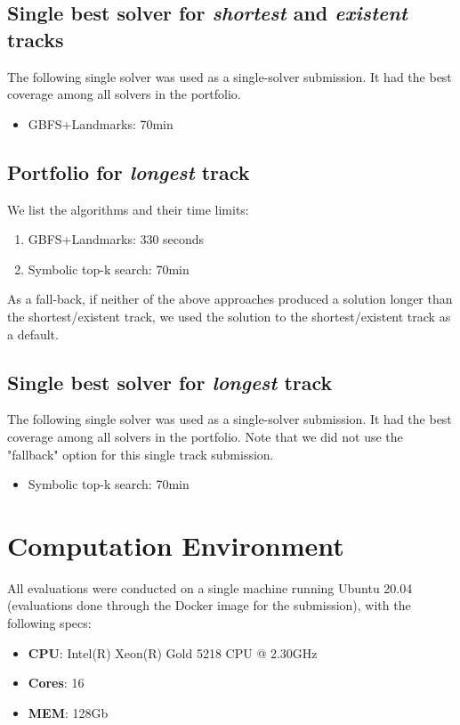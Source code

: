 \documentclass{article}
\begin{document}
\subsection{Single best solver for \emph{shortest} and \emph{existent} tracks}

The following single solver was used as a single-solver submission. It had the best coverage among all solvers in the portfolio.

\begin{itemize}
    \item GBFS+Landmarks: 70min
\end{itemize}

\subsection{Portfolio for \emph{longest} track}

We list the algorithms and their time limits:

\begin{enumerate}
\item GBFS+Landmarks: 330 seconds
\item Symbolic top-k search: 70min
\end{enumerate}

As a fall-back, if neither of the above approaches produced a solution longer than the shortest/existent track, we used the solution to the shortest/existent track as a default.

\subsection{Single best solver for \emph{longest} track}

The following single solver was used as a single-solver submission. It had the best coverage among all solvers in the portfolio. Note that we did not use the "fallback" option for this single track submission.

\begin{itemize}
    \item Symbolic top-k search: 70min
\end{itemize}



\section{Computation Environment}

All evaluations were conducted on a single machine running Ubuntu 20.04 (evaluations done through the Docker image for the submission), with the following specs:
\begin{itemize}
\item \textbf{CPU}: Intel(R) Xeon(R) Gold 5218 CPU @ 2.30GHz
\item \textbf{Cores}: 16
\item \textbf{MEM}: 128Gb
\end{itemize}





\end{document}
